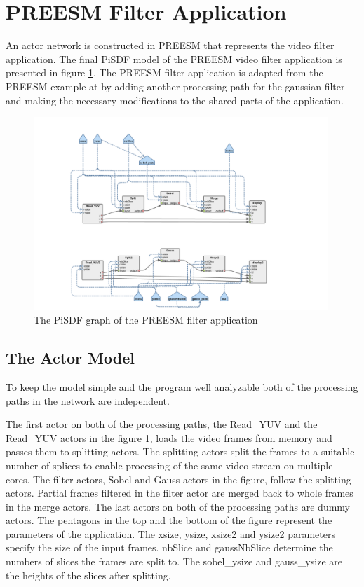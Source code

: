 \section{PREESM Filter Application}
\label{sec:preesmapp}
An actor network is constructed in PREESM that represents the video filter
application. The final PiSDF model of the PREESM video filter application is
presented in figure \ref{fig:preesm_actors}. The PREESM filter application is
adapted from the PREESM example at \cite{preesmtut} by adding another
processing path for the gaussian filter and making the necessary modifications
to the shared parts of the application.

\begin{figure}[h!] \label{fig:preesm_actors} \begin{center}
    \includegraphics[width=0.99\textwidth]{images/preesm_diagram.png}
    \caption{The PiSDF graph of the PREESM filter application} \end{center}
\end{figure}

\subsection{The Actor Model}
\label{subsec:actors}
To keep the model simple and the program well analyzable both of the processing
paths in the network are independent.

The first actor on both of the processing paths, the Read\_YUV and the
Read\_YUV actors in the figure \ref{fig:preesm_actors}, loads the video frames
from memory and passes them to splitting actors. The splitting actors split the
frames to a suitable number of splices to enable processing of the same video
stream on multiple cores. The filter actors, Sobel and Gauss actors in the
figure, follow the splitting actors. Partial frames filtered in the filter
actor are merged back to whole frames in the merge actors. The last actors on
both of the processing paths are dummy actors. The pentagons in the top and the
bottom of the figure represent the parameters of the application. The xsize,
ysize, xsize2 and ysize2 parameters specify the size of the input frames.
nbSlice and gaussNbSlice determine the numbers of slices the frames are split
to. The sobel\_ysize and gauss\_ysize are the heights of the slices after
splitting.

